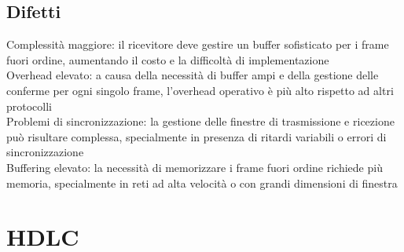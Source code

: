 \documentclass[10pt,oneside,a4paper]{article}
\begin{document}
\subsection{Difetti}
Complessità maggiore: il ricevitore deve gestire un buffer sofisticato per i frame fuori ordine, aumentando il costo e la difficoltà di implementazione\\
Overhead elevato: a causa della necessità di buffer ampi e della gestione delle conferme per ogni singolo frame, l'overhead operativo è più alto rispetto ad altri protocolli\\
Problemi di sincronizzazione: la gestione delle finestre di trasmissione e ricezione può risultare complessa, specialmente in presenza di ritardi variabili o errori di sincronizzazione\\
Buffering elevato: la necessità di memorizzare i frame fuori ordine richiede più memoria, specialmente in reti ad alta velocità o con grandi dimensioni di finestra
\section{HDLC}
\end{document}
